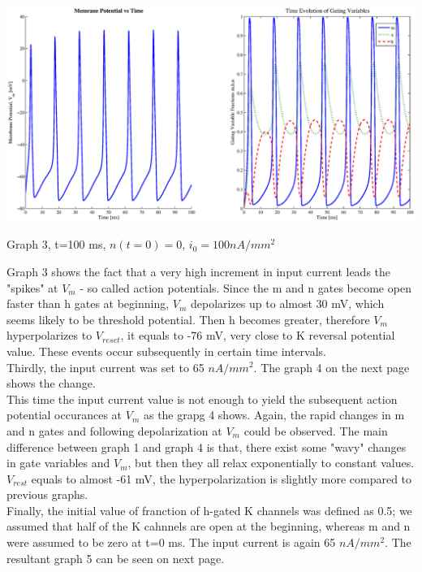 \documentclass{article}
\begin{document}
\begin{center}
 \includegraphics[width=\textwidth]{discus2.eps}
\begin{footnotesize}Graph 3, t=100 ms, $n(t=0)=0$, $i_{0}=100 nA/mm^2$  \end{footnotesize}
\end{center}

Graph 3 shows the fact that a very high increment in input current leads the "spikes" at $V_{m}$ - so called action potentials. Since the m and n gates become open faster than h gates at beginning, $V_{m}$ depolarizes up to almost 30 mV, which seems likely to be threshold potential. Then h becomes greater, therefore $V_{m}$ hyperpolarizes to $V_{reset}$, it equals to -76 mV, very close to K reversal potential value. These events occur subsequently in certain time intervals.\\

Thirdly, the input current was set to 65 $nA/mm^2$. The graph 4 on the next page shows the change.\\

This time the input current value is not enough to yield the subsequent action potential occurances at $V_{m}$ as the grapg 4 shows. Again, the rapid changes in m and n gates and following depolarization at $V_{m}$ could be observed. The main difference between graph 1 and graph 4 is that, there exist some "wavy" changes in gate variables and $V_{m}$, but then they all relax exponentially to constant values. $V_{rest}$ equals to almost -61 mV, the hyperpolarization is slightly more compared to previous graphs.\\

Finally, the initial value of franction of h-gated K channels was defined as 0.5; we assumed that half of the K cahnnels are open at the beginning, whereas m and n were assumed to be zero at t=0 ms. The input current is again 65 $nA/mm^2$. The resultant graph 5 can be seen on next page.
\end{document}
